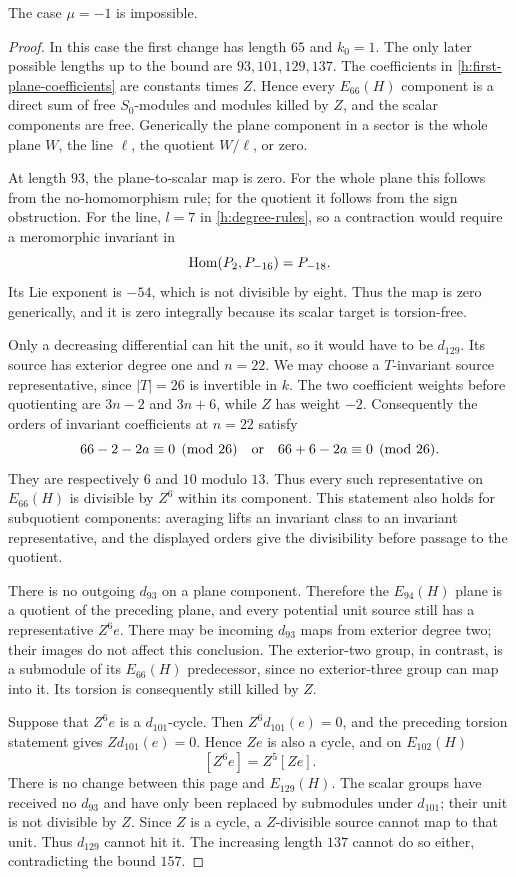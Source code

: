 \begin{lemma}
 \label{h:exclude-minus}
 The case $\mu=-1$ is impossible.
\end{lemma}

\begin{proof}
In this case the first change has length $65$ and $k_0=1$. The only
later possible lengths up to the bound are $93,101,129,137$.
The coefficients in \eqref{h:first-plane-coefficients} are constants
times $Z$. Hence every $E_{66}(H)$ component is a direct sum of free
$S_0$-modules and modules killed by $Z$, and the scalar components
are free. Generically the plane component in a sector is the whole
plane $W$, the line $\ell$, the quotient $W/\ell$, or zero.

At length $93$, the plane-to-scalar map is zero. For the whole plane
this follows from the no-homomorphism rule; for the quotient it
follows from the sign obstruction. For the line, $l=7$ in
\eqref{h:degree-rules}, so a contraction would require a meromorphic
invariant in
\[
 \operatorname{Hom}(P_2,P_{-16})=P_{-18}.
\]
Its Lie exponent is $-54$, which is not divisible by eight. Thus the
map is zero generically, and it is zero integrally because its scalar
target is torsion-free.

Only a decreasing differential can hit the unit, so it would have to
be $d_{129}$. Its source has exterior degree one and $n=22$.
We may choose a $T$-invariant source representative, since $|T|=26$
is invertible in $k$. The two coefficient weights before quotienting
are $3n-2$ and $3n+6$, while $Z$ has weight $-2$. Consequently the
orders of invariant coefficients at $n=22$ satisfy
\[
 66-2-2a\equiv0\pmod{26}
 \quad\hbox{or}\quad
 66+6-2a\equiv0\pmod{26}.
\]
They are respectively $6$ and $10$ modulo $13$. Thus every such
representative on $E_{66}(H)$ is divisible by $Z^6$ within its
component. This statement also holds for subquotient components:
averaging lifts an invariant class to an invariant representative,
and the displayed orders give the divisibility before passage to
the quotient.

There is no outgoing $d_{93}$ on a plane component. Therefore the
$E_{94}(H)$ plane is a quotient of the preceding plane, and every
potential unit source still has a representative $Z^6e$. There may
be incoming $d_{93}$ maps from exterior degree two; their images do
not affect this conclusion. The exterior-two group, in contrast,
is a submodule of its $E_{66}(H)$ predecessor, since no exterior-three
group can map into it. Its torsion is consequently still killed by
$Z$.

Suppose that $Z^6e$ is a $d_{101}$-cycle. Then
$Z^6d_{101}(e)=0$, and the preceding torsion statement gives
$Zd_{101}(e)=0$. Hence $Ze$ is also a cycle, and on $E_{102}(H)$
\[
 [Z^6e]=Z^5[Ze].
\]
There is no change between this page and $E_{129}(H)$. The scalar
groups have received no $d_{93}$ and have only been replaced by
submodules under $d_{101}$; their unit is not divisible by $Z$.
Since $Z$ is a cycle, a $Z$-divisible source cannot map to that unit.
Thus $d_{129}$ cannot hit it. The increasing length $137$ cannot do
so either, contradicting the bound $157$.
\end{proof}

